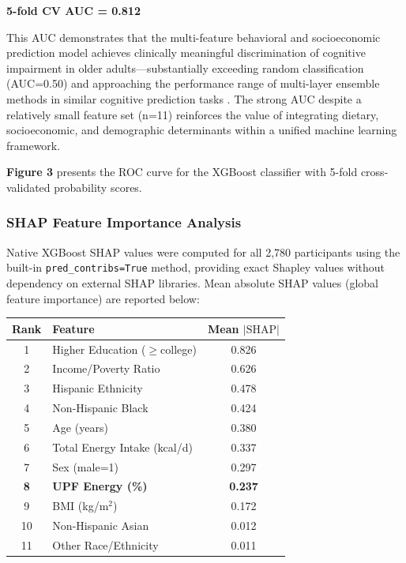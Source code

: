 \documentclass[journal,twoside,10pt]{IEEEtran}
\begin{document}
\textbf{5-fold CV AUC = 0.812}

This AUC demonstrates that the multi-feature behavioral and socioeconomic prediction model achieves clinically meaningful discrimination of cognitive impairment in older adults---substantially exceeding random classification (AUC=0.50) and approaching the performance range of multi-layer ensemble methods in similar cognitive prediction tasks \cite{ref26}. The strong AUC despite a relatively small feature set (n=11) reinforces the value of integrating dietary, socioeconomic, and demographic determinants within a unified machine learning framework.

\textbf{Figure 3} presents the ROC curve for the XGBoost classifier with 5-fold cross-validated probability scores.

\subsubsection{SHAP Feature Importance Analysis}

Native XGBoost SHAP values were computed for all 2,780 participants using the built-in \texttt{pred\_contribs=True} method, providing exact Shapley values without dependency on external SHAP libraries. Mean absolute SHAP values (global feature importance) are reported below:

\begin{tabular}{clc}
\hline
\textbf{Rank} & \textbf{Feature} & \textbf{Mean $|\text{SHAP}|$} \\
\hline
1  & Higher Education ($\geq$college)  & 0.826 \\
2  & Income/Poverty Ratio              & 0.626 \\
3  & Hispanic Ethnicity                & 0.478 \\
4  & Non-Hispanic Black                & 0.424 \\
5  & Age (years)                       & 0.380 \\
6  & Total Energy Intake (kcal/d)      & 0.337 \\
7  & Sex (male=1)                      & 0.297 \\
\textbf{8}  & \textbf{UPF Energy (\%)}  & \textbf{0.237} \\
9  & BMI (kg/m$^2$)                    & 0.172 \\
10 & Non-Hispanic Asian                & 0.012 \\
11 & Other Race/Ethnicity              & 0.011 \\
\hline
\end{tabular}
\end{document}
